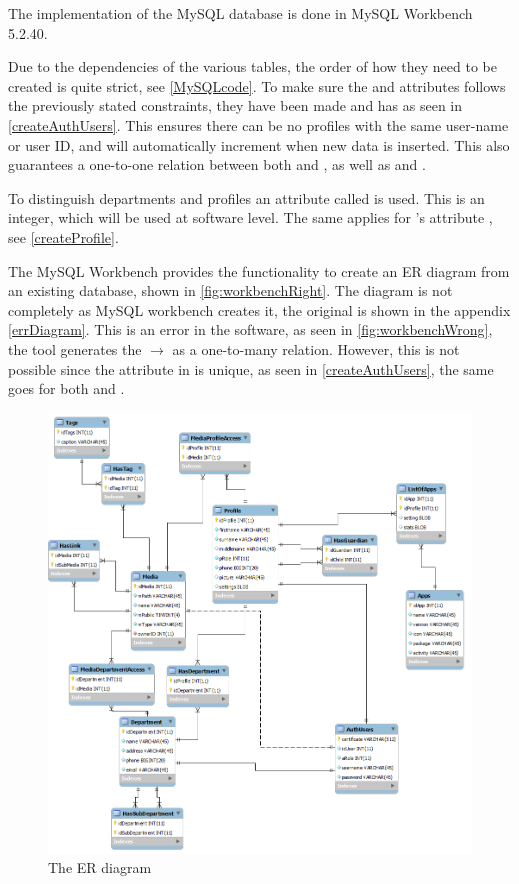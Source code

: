 The implementation of the MySQL database is done in MySQL Workbench 5.2.40.

Due to the dependencies of the various tables, the order of how they need to be created is quite strict, see \autoref{MySQLcode}. 
To make sure the  and  attributes follows the previously stated constraints, they have been made  and  has  as seen in \autoref{createAuthUsers}. 
This ensures there can be no profiles with the same user-name or user ID, and  will automatically increment when new data is inserted. 
This also guarantees a one-to-one relation between both  and , as well as  and . 

To distinguish departments and profiles an attribute called  is used. 
This is an integer, which will be used at software level. The same applies for 's attribute , see \autoref{createProfile}.

The MySQL Workbench provides the functionality to create an ER diagram from an existing database, shown in \autoref{fig:workbenchRight}. The diagram is not completely as MySQL workbench creates it, the original is shown in the appendix \autoref{errDiagram}. This is an error in the software, as seen in \autoref{fig:workbenchWrong}, the tool generates the $\rightarrow$ as a one-to-many relation. However, this is not possible since the  attribute in  is unique, as seen in \autoref{createAuthUsers}, the same goes for both  and .

\begin{figure}
	\centering
		\includegraphics[width=1.00\textwidth]{images/workbenchRight.png}
	\caption{The ER diagram}
	\label{fig:workbenchRight}
\end{figure}

